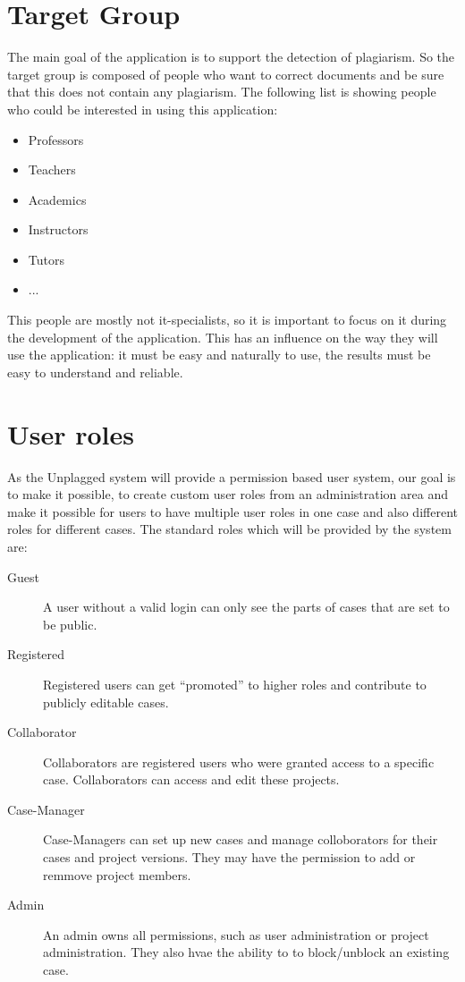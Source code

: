 \section{Target Group}

The main goal of the application is to support the detection of plagiarism. So the target group is composed of people who want to correct documents and be sure that this does not contain any plagiarism.
\minisec{}
The following list is showing people who could be interested in using this application:
\minisec{}
\begin{itemize}
\item Professors 
\item Teachers
\item Academics
\item Instructors
\item Tutors
\item ...
\end{itemize}
\minisec{}
This people are mostly not it-specialists, so it is important to focus on it during the development of the application. This has an influence on the way they will use the application: it must be easy and naturally to use, the results must be easy to understand and reliable.

\section{User roles}
As the Unplagged system will provide a permission based user system, our goal is to make it possible, to create custom user roles from an administration area and make it possible for users to have multiple user roles in one case and also different roles for different cases.
The standard roles which will be provided by the system are:

\begin{description}
\item[Guest]
A user without a valid login can only see the parts of cases that are set to be public.
\item[Registered]
Registered users can get \enquote{promoted} to higher roles and contribute to publicly editable cases.
\item[Collaborator]
Collaborators are registered users who were granted access to a specific case. Collaborators can access and edit these projects.
\item[Case-Manager]
Case-Managers can set up new cases and manage colloborators for their cases and project versions. They may have the permission to add or remmove project members.
\item[Admin]
An admin owns all permissions, such as user administration or project administration. They also hvae the ability to to block/unblock an existing case.
\end{description}

